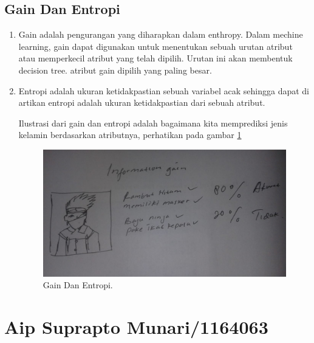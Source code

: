 \subsection{Gain Dan Entropi}
\begin{enumerate}
\item Gain adalah pengurangan yang diharapkan dalam enthropy. Dalam mechine learning, gain dapat digunakan untuk menentukan sebuah urutan atribut atau memperkecil atribut yang telah dipilih. Urutan ini akan membentuk decision tree. atribut gain dipilih yang paling besar.

\item Entropi adalah ukuran ketidakpastian sebuah variabel acak sehingga dapat di artikan entropi adalah ukuran ketidakpastian dari sebuah atribut.

\subitem Ilustrasi dari gain dan entropi adalah bagaimana kita memprediksi jenis kelamin berdasarkan atributnya, perhatikan pada gambar \ref{7}

		\begin{figure}[!hbtp]
		\centerline{\includegraphics[width=1\textwidth]{figures/AIP/7.JPEG}}
		\caption{Gain Dan Entropi.}
		\label{7}
		\end{figure}
\end{enumerate}

\section{Aip Suprapto Munari/1164063}
